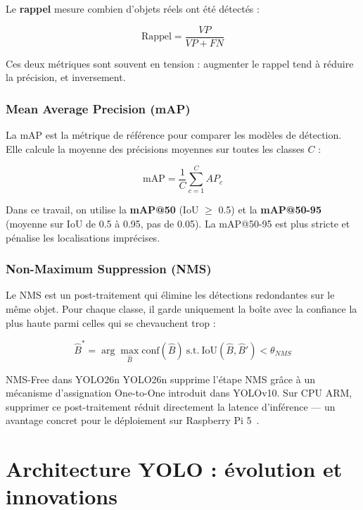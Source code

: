 Le \textbf{rappel} mesure combien d'objets
réels ont été détectés :

\begin{equation}
\text{Rappel} = \frac{VP}{VP + FN}
\label{eq:recall}
\end{equation}

Ces deux métriques sont souvent en tension :
augmenter le rappel tend à réduire la
précision, et inversement.

\subsubsection{Mean Average Precision (mAP)}

La mAP est la métrique de référence pour
comparer les modèles de détection. Elle calcule
la moyenne des précisions moyennes sur toutes
les classes $C$ :

\begin{equation}
\text{mAP} = \frac{1}{C} \sum_{c=1}^{C} AP_c
\label{eq:map}
\end{equation}

Dans ce travail, on utilise la \textbf{mAP@50}
(IoU $\geq$ 0.5) et la \textbf{mAP@50-95}
(moyenne sur IoU de 0.5 à 0.95, pas de 0.05).
La mAP@50-95 est plus stricte et pénalise
les localisations imprécises.

\subsubsection{Non-Maximum Suppression (NMS)}

Le NMS est un post-traitement qui élimine
les détections redondantes sur le même objet.
Pour chaque classe, il garde uniquement la
boîte avec la confiance la plus haute parmi
celles qui se chevauchent trop :

\begin{equation}
\hat{B}^* = \arg\max_{\hat{B}}
\text{conf}(\hat{B})\
\text{s.t.}\
\text{IoU}(\hat{B}, \hat{B}') < \theta_{NMS}
\label{eq:nms}
\end{equation}

\begin{definitionbox}{NMS-Free dans YOLO26n}
YOLO26n supprime l'étape NMS grâce à un
mécanisme d'assignation One-to-One introduit
dans YOLOv10. Sur CPU ARM, supprimer ce
post-traitement réduit directement la latence
d'inférence — un avantage concret pour
le déploiement sur Raspberry Pi 5~\cite{sapkota2025}.
\end{definitionbox}

\section{Architecture YOLO : évolution et
         innovations}

